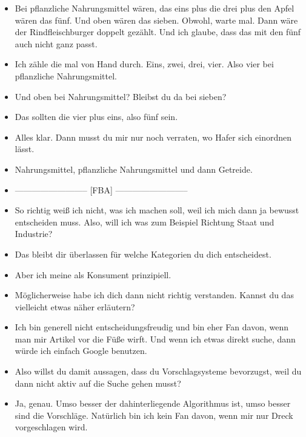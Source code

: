 {\begin{itemize}[]
            \item {} Bei pflanzliche Nahrungsmittel wären, das eins plus die drei plus den Apfel wären das fünf.
                  Und oben wären das sieben.
                  Obwohl, warte mal.
                  Dann wäre der Rindfleischburger doppelt gezählt.
                  Und ich glaube, dass das mit den fünf auch nicht ganz passt.
            \item {} Ich zähle die mal von Hand durch. Eins, zwei, drei, vier. Also vier bei pflanzliche Nahrungsmittel.
            \item {} Und oben bei Nahrungsmittel? Bleibst du da bei sieben?
            \item {} Das sollten die vier plus eins, also fünf sein.
            \item {} Alles klar. Dann musst du mir nur noch verraten, wo Hafer sich einordnen lässt.
            \item {} Nahrungsmittel, pflanzliche Nahrungsmittel und dann Getreide.
            \item {--------------------------} [FBA] {--------------------------}
            \item {} So richtig weiß ich nicht, was ich machen soll, weil ich mich dann ja bewusst entscheiden muss.
                  Also, will ich was zum Beispiel Richtung Staat und Industrie?
            \item {} Das bleibt dir überlassen für welche Kategorien du dich entscheidest.
            \item {} Aber ich meine als Konsument prinzipiell.
            \item {} Möglicherweise habe ich dich dann nicht richtig verstanden. Kannst du das vielleicht etwas näher erläutern?
            \item {} Ich bin generell nicht entscheidungsfreudig und bin eher Fan davon, wenn man mir Artikel vor die Füße wirft.
                  Und wenn ich etwas direkt suche, dann würde ich einfach Google benutzen.
            \item {} Also willst du damit aussagen, dass du Vorschlagsysteme bevorzugst, weil du dann nicht aktiv auf die Suche gehen musst?
            \item {} Ja, genau.
                  Umso besser der dahinterliegende Algorithmus ist, umso besser sind die Vorschläge.
                  Natürlich bin ich kein Fan davon, wenn mir nur Dreck vorgeschlagen wird.

\end{itemize}}
